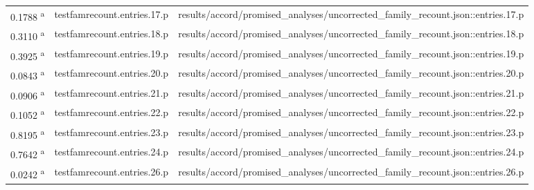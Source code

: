 \begin{longtable}{@{}p{0.7in}p{1.9in}p{2.6in}@{}}
0.1788 \textsuperscript{a} & testfamrecount.\allowbreak{}entries.\allowbreak{}17.\allowbreak{}p & results/\allowbreak{}accord/\allowbreak{}promised\_analyses/\allowbreak{}uncorrected\_family\_recount.\allowbreak{}json::entries.\allowbreak{}17.\allowbreak{}p\\
0.3110 \textsuperscript{a} & testfamrecount.\allowbreak{}entries.\allowbreak{}18.\allowbreak{}p & results/\allowbreak{}accord/\allowbreak{}promised\_analyses/\allowbreak{}uncorrected\_family\_recount.\allowbreak{}json::entries.\allowbreak{}18.\allowbreak{}p\\
0.3925 \textsuperscript{a} & testfamrecount.\allowbreak{}entries.\allowbreak{}19.\allowbreak{}p & results/\allowbreak{}accord/\allowbreak{}promised\_analyses/\allowbreak{}uncorrected\_family\_recount.\allowbreak{}json::entries.\allowbreak{}19.\allowbreak{}p\\
0.0843 \textsuperscript{a} & testfamrecount.\allowbreak{}entries.\allowbreak{}20.\allowbreak{}p & results/\allowbreak{}accord/\allowbreak{}promised\_analyses/\allowbreak{}uncorrected\_family\_recount.\allowbreak{}json::entries.\allowbreak{}20.\allowbreak{}p\\
0.0906 \textsuperscript{a} & testfamrecount.\allowbreak{}entries.\allowbreak{}21.\allowbreak{}p & results/\allowbreak{}accord/\allowbreak{}promised\_analyses/\allowbreak{}uncorrected\_family\_recount.\allowbreak{}json::entries.\allowbreak{}21.\allowbreak{}p\\
0.1052 \textsuperscript{a} & testfamrecount.\allowbreak{}entries.\allowbreak{}22.\allowbreak{}p & results/\allowbreak{}accord/\allowbreak{}promised\_analyses/\allowbreak{}uncorrected\_family\_recount.\allowbreak{}json::entries.\allowbreak{}22.\allowbreak{}p\\
0.8195 \textsuperscript{a} & testfamrecount.\allowbreak{}entries.\allowbreak{}23.\allowbreak{}p & results/\allowbreak{}accord/\allowbreak{}promised\_analyses/\allowbreak{}uncorrected\_family\_recount.\allowbreak{}json::entries.\allowbreak{}23.\allowbreak{}p\\
0.7642 \textsuperscript{a} & testfamrecount.\allowbreak{}entries.\allowbreak{}24.\allowbreak{}p & results/\allowbreak{}accord/\allowbreak{}promised\_analyses/\allowbreak{}uncorrected\_family\_recount.\allowbreak{}json::entries.\allowbreak{}24.\allowbreak{}p\\
0.0242 \textsuperscript{a} & testfamrecount.\allowbreak{}entries.\allowbreak{}26.\allowbreak{}p & results/\allowbreak{}accord/\allowbreak{}promised\_analyses/\allowbreak{}uncorrected\_family\_recount.\allowbreak{}json::entries.\allowbreak{}26.\allowbreak{}p\\

\end{longtable}
